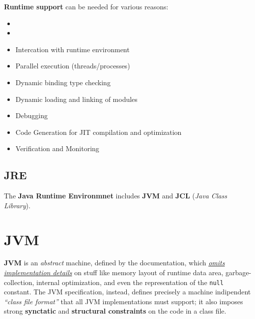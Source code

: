 \textbf{Runtime support} can be needed for various reasons:
\begin{itemize}
    \item %
    \item {}
    \item Intercation with runtime environment
    \item Parallel execution (threads/processes)
    \item Dynamic binding type checking
    \item Dynamic loading and linking of modules
    \item Debugging
    \item Code Generation for JIT compilation and optimization
    \item Verification and Monitoring
\end{itemize}

\subsection{JRE}
The \textbf{Java Runtime Environmnet} includes \textbf{JVM} and \textbf{JCL} (\textit{Java Class Library}).

\section{JVM}
\textbf{JVM} is an \textit{abstract} machine, defined by the documentation,
which \ul{\textit{omits implementation details}} on stuff like memory layout of runtime data area, garbage-collection, internal optimization, and even the representation of the \lstinline{null} constant.
The JVM specification, instead, defines precisely a machine indipendent \textit{``class file format''} that all JVM implementations must support;
it also imposes strong \textbf{synctatic} and \textbf{structural constraints} on the code in a class file.
\nl

